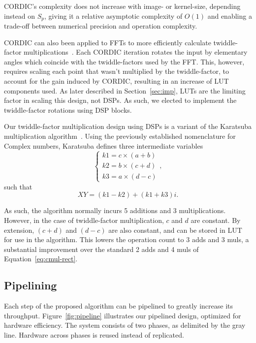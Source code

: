 \documentclass[
  10pt,
  \FORMAT-MODE,
  \REVIEW-MODE,
  \TWOSIDE-MODE
]{IEEEtran}
\begin{document}
  CORDIC's complexity does not increase with image- or kernel-size, depending instead on $S_p$, giving it a relative asymptotic complexity of $O(1)$ and enabling a trade-off between numerical precision and operation complexity.

  CORDIC can also been applied to FFTs to more efficiently calculate twiddle-factor multiplications~\cite{banerjee2001fpga,choudhary2011cordic}. Each CORDIC iteration rotates the input by elementary angles which coincide with the twiddle-factors used by the FFT. This, however, requires scaling each point that wasn't multiplied by the twiddle-factor, to account for the gain induced by CORDIC, resulting in an increase of LUT components used. As later described in Section~\ref{sec:imp}, LUTs are the limiting factor in scaling this design, not DSPs. As such, we elected to implement the twiddle-factor rotations using DSP blocks.

  Our twiddle-factor multiplication design using DSPs is a variant of the Karatsuba multiplication algorithm~\cite{karatsuba1962multiplication}. Using the previously established nomenclature for Complex numbers, Karatsuba defines three intermediate variables
  \begin{equation}\label{eq:kara1}
    \begin{cases}
      k1 = c {\times} (a+b) \\
      k2 = b {\times} (c+d) \\
      k3 = a {\times} (d-c)
    \end{cases},
  \end{equation}
  such that
  \begin{equation}\label{eq:kara2}
    XY = (k1 - k2) + (k1 + k3)i.
  \end{equation}

  As such, the algorithm normally incurs 5 additions and 3 multiplications. However, in the case of twiddle-factor multiplication, $c$ and $d$ are constant. By extension, $(c+d)$ and $(d-c)$ are also constant, and can be stored in LUT for use in the algorithm. This lowers the operation count to 3 adds and 3 muls, a substantial improvement over the standard 2 adds and 4 muls of Equation~\ref{eq:cmul-rect}.
  
  \subsection{Pipelining}\label{ssec:pipe}
    Each step of the proposed algorithm can be pipelined to greatly increase its throughput. Figure~\ref{fig:pipeline} illustrates our pipelined design, optimized for hardware efficiency. The system consists of two phases, as delimited by the gray line. Hardware across phases is reused instead of replicated.
\end{document}
